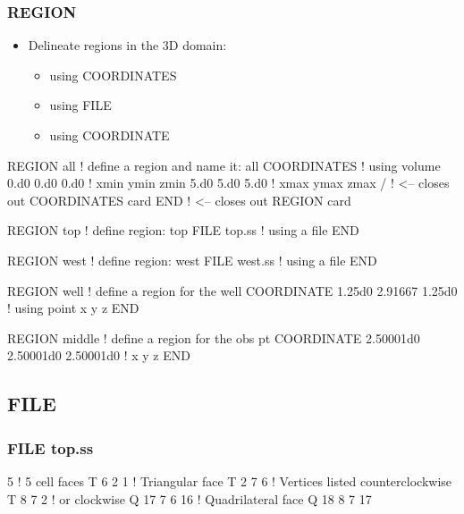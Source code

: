 \documentclass{beamer}
\newcommand\redcomment[1]{{{\color{red} #1}}}
\newcommand\bluecomment[1]{{{\color{blue} #1}}}
\newcommand\greencomment[1]{{{\color{green} #1}}}
\begin{document}
\begin{frame}\frametitle{REGION}

\begin{itemize}
  \item Delineate regions in the 3D domain:
  \begin{itemize}
    \item using COORDINATES
    \item using FILE
    \item using COORDINATE
  \end{itemize}
\end{itemize}

\begin{semiverbatim}
REGION all            \bluecomment{! define a region and name it: \greencomment{all}}
  COORDINATES         \bluecomment{! using \redcomment{volume}}
    0.d0 0.d0 0.d0    \bluecomment{! xmin ymin zmin}
    5.d0 5.d0 5.d0    \bluecomment{! xmax ymax zmax}
  /   \bluecomment{! <-- closes out COORDINATES card}
END   \bluecomment{! <-- closes out REGION card}

\newpage
REGION top      \bluecomment{! define region:} \greencomment{top}
  FILE top.ss   \bluecomment{! using a file}
END

REGION west     \bluecomment{! define region:} \greencomment{west}
  FILE west.ss  \bluecomment{! using a file}
END

REGION well  \bluecomment{! define a region for the well}
  COORDINATE 1.25d0 2.91667 1.25d0 \bluecomment{! using \redcomment{point} x y z}
END

REGION middle \bluecomment{! define a region for the obs pt}
  COORDINATE 2.50001d0 2.50001d0 2.50001d0 \bluecomment{! x y z}
END

\end{semiverbatim}

\end{frame}

\subsection{FILE}

\begin{frame}[fragile]\frametitle{FILE top.ss}

\begin{semiverbatim}
5 \bluecomment{! 5 cell faces}
T 6 2 1     \bluecomment{! Triangular face}
T 2 7 6     \bluecomment{! Vertices listed counterclockwise}
T 8 7 2     \bluecomment{! or clockwise}
Q 17 7 6 16 \bluecomment{! Quadrilateral face}
Q 18 8 7 17
\end{semiverbatim}

\end{frame}
\end{document}
